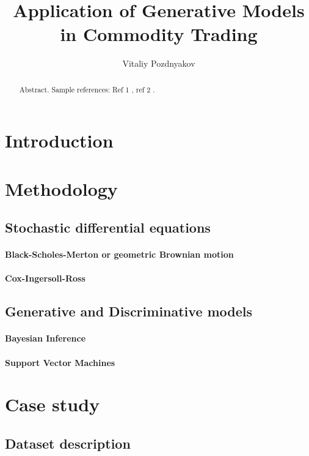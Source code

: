 \documentclass{article}
\title{Application of Generative Models \\ in Commodity Trading}
\author{Vitaliy Pozdnyakov}
\date{}
\begin{document}
\maketitle

\begin{abstract}
    Abstract. Sample references: Ref 1 \cite{renscen}, ref 2 \citet{jebara}.
\end{abstract}

\section{Introduction}

\section{Methodology}

\subsection{Stochastic differential equations}

\paragraph{Black-Scholes-Merton or geometric Brownian motion}
\paragraph{Cox-Ingersoll-Ross}

\subsection{Generative and Discriminative models}

\paragraph{Bayesian Inference}

\paragraph{Support Vector Machines}

\section{Case study}

\subsection{Dataset description}
\end{document}
